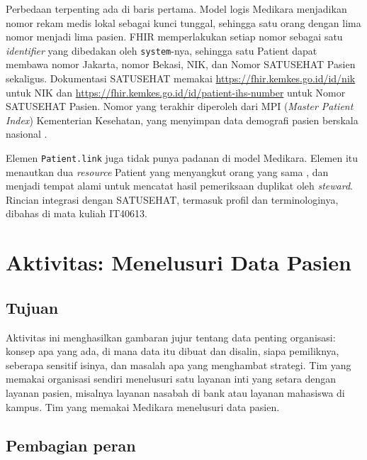 \begin{pendalaman}
  Perbedaan terpenting ada di baris pertama. Model logis Medikara menjadikan
  nomor rekam medis lokal sebagai kunci tunggal, sehingga satu orang dengan
  lima nomor menjadi lima pasien. FHIR memperlakukan setiap nomor sebagai satu
  \textit{identifier} yang dibedakan oleh \texttt{system}-nya, sehingga satu
  Patient dapat membawa nomor Jakarta, nomor Bekasi, NIK, dan Nomor SATUSEHAT
  Pasien sekaligus. Dokumentasi SATUSEHAT memakai
  \url{https://fhir.kemkes.go.id/id/nik} untuk NIK dan
  \url{https://fhir.kemkes.go.id/id/patient-ihs-number} untuk Nomor SATUSEHAT
  Pasien. Nomor yang terakhir diperoleh dari MPI (\textit{Master Patient
  Index}) Kementerian Kesehatan, yang menyimpan data demografi pasien berskala
  nasional \cite{c06-satusehat-patient}.

  Elemen \texttt{Patient.link} juga tidak punya padanan di model Medikara.
  Elemen itu menautkan dua \textit{resource} Patient yang menyangkut orang yang
  sama \cite{c06-fhir-patient}, dan menjadi tempat alami untuk mencatat hasil
  pemeriksaan duplikat oleh \textit{steward}. Rincian integrasi dengan SATUSEHAT, termasuk
  profil dan terminologinya, dibahas di mata kuliah IT40613.
\end{pendalaman}

\section{Aktivitas: Menelusuri Data Pasien}

\subsection*{Tujuan}

Aktivitas ini menghasilkan gambaran jujur tentang data penting organisasi:
konsep apa yang ada, di mana data itu dibuat dan disalin, siapa pemiliknya,
seberapa sensitif isinya, dan masalah apa yang menghambat strategi. Tim yang
memakai organisasi sendiri menelusuri satu layanan inti yang setara dengan
layanan pasien, misalnya layanan nasabah di bank atau layanan mahasiswa di
kampus. Tim yang memakai Medikara menelusuri data pasien.

\subsection*{Pembagian peran}

